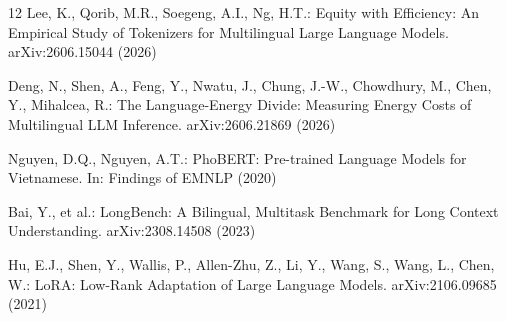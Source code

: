 \documentclass[runningheads]{llncs}
\begin{document}
\begin{thebibliography}{12}
Lee, K., Qorib, M.R., Soegeng, A.I., Ng, H.T.: Equity with Efficiency: An Empirical Study of Tokenizers for Multilingual Large Language Models. arXiv:2606.15044 (2026)

Deng, N., Shen, A., Feng, Y., Nwatu, J., Chung, J.-W., Chowdhury, M., Chen, Y., Mihalcea, R.: The Language-Energy Divide: Measuring Energy Costs of Multilingual LLM Inference. arXiv:2606.21869 (2026)

Nguyen, D.Q., Nguyen, A.T.: PhoBERT: Pre-trained Language Models for Vietnamese. In: Findings of EMNLP (2020)

Bai, Y., et al.: LongBench: A Bilingual, Multitask Benchmark for Long Context Understanding. arXiv:2308.14508 (2023)

Hu, E.J., Shen, Y., Wallis, P., Allen-Zhu, Z., Li, Y., Wang, S., Wang, L., Chen, W.: LoRA: Low-Rank Adaptation of Large Language Models. arXiv:2106.09685 (2021)

\end{thebibliography}
\end{document}

